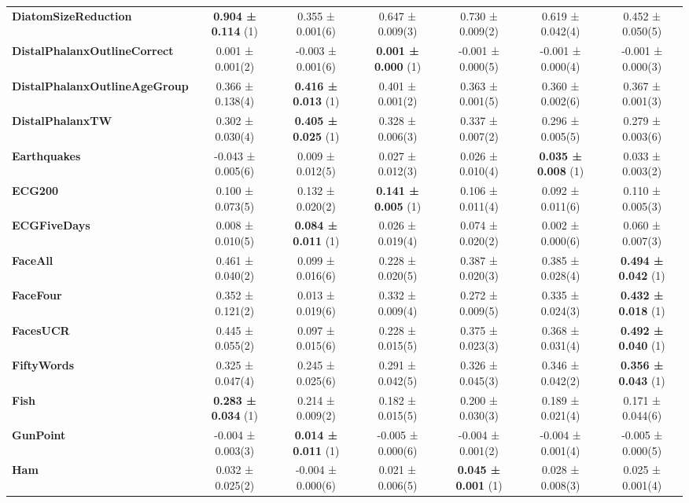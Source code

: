 \begin{table}[ht]
\begin{adjustbox}{width=\textwidth}
\begin{tabular}{lcccccc}
    \textbf{DiatomSizeReduction} & \textbf{0.904 ± 0.114} (1) & 0.355 ± 0.001(6) & 0.647 ± 0.009(3) & 0.730 ± 0.009(2) & 0.619 ± 0.042(4) & 0.452 ± 0.050(5) \\
    \textbf{DistalPhalanxOutlineCorrect} & 0.001 ± 0.001(2) & -0.003 ± 0.001(6) & \textbf{0.001 ± 0.000} (1) & -0.001 ± 0.000(5) & -0.001 ± 0.000(4) & -0.001 ± 0.000(3) \\
    \textbf{DistalPhalanxOutlineAgeGroup} & 0.366 ± 0.138(4) & \textbf{0.416 ± 0.013} (1) & 0.401 ± 0.001(2) & 0.363 ± 0.001(5) & 0.360 ± 0.002(6) & 0.367 ± 0.001(3) \\
    \textbf{DistalPhalanxTW} & 0.302 ± 0.030(4) & \textbf{0.405 ± 0.025} (1) & 0.328 ± 0.006(3) & 0.337 ± 0.007(2) & 0.296 ± 0.005(5) & 0.279 ± 0.003(6) \\
    \textbf{Earthquakes} & -0.043 ± 0.005(6) & 0.009 ± 0.012(5) & 0.027 ± 0.012(3) & 0.026 ± 0.010(4) & \textbf{0.035 ± 0.008} (1) & 0.033 ± 0.003(2) \\
    \textbf{ECG200} & 0.100 ± 0.073(5) & 0.132 ± 0.020(2) & \textbf{0.141 ± 0.005} (1) & 0.106 ± 0.011(4) & 0.092 ± 0.011(6) & 0.110 ± 0.005(3) \\
    \textbf{ECGFiveDays} & 0.008 ± 0.010(5) & \textbf{0.084 ± 0.011} (1) & 0.026 ± 0.019(4) & 0.074 ± 0.020(2) & 0.002 ± 0.000(6) & 0.060 ± 0.007(3) \\
    \textbf{FaceAll} & 0.461 ± 0.040(2) & 0.099 ± 0.016(6) & 0.228 ± 0.020(5) & 0.387 ± 0.020(3) & 0.385 ± 0.028(4) & \textbf{0.494 ± 0.042} (1) \\
    \textbf{FaceFour} & 0.352 ± 0.121(2) & 0.013 ± 0.019(6) & 0.332 ± 0.009(4) & 0.272 ± 0.009(5) & 0.335 ± 0.024(3) & \textbf{0.432 ± 0.018} (1) \\
    \textbf{FacesUCR} & 0.445 ± 0.055(2) & 0.097 ± 0.015(6) & 0.228 ± 0.015(5) & 0.375 ± 0.023(3) & 0.368 ± 0.031(4) & \textbf{0.492 ± 0.040} (1) \\
    \textbf{FiftyWords} & 0.325 ± 0.047(4) & 0.245 ± 0.025(6) & 0.291 ± 0.042(5) & 0.326 ± 0.045(3) & 0.346 ± 0.042(2) & \textbf{0.356 ± 0.043} (1) \\
    \textbf{Fish} & \textbf{0.283 ± 0.034} (1) & 0.214 ± 0.009(2) & 0.182 ± 0.015(5) & 0.200 ± 0.030(3) & 0.189 ± 0.021(4) & 0.171 ± 0.044(6) \\
    \textbf{GunPoint} & -0.004 ± 0.003(3) & \textbf{0.014 ± 0.011} (1) & -0.005 ± 0.000(6) & -0.004 ± 0.001(2) & -0.004 ± 0.001(4) & -0.005 ± 0.000(5) \\
    \textbf{Ham} & 0.032 ± 0.025(2) & -0.004 ± 0.000(6) & 0.021 ± 0.006(5) & \textbf{0.045 ± 0.001} (1) & 0.028 ± 0.008(3) & 0.025 ± 0.001(4) \\

\end{tabular}
\end{adjustbox}
\end{table}
